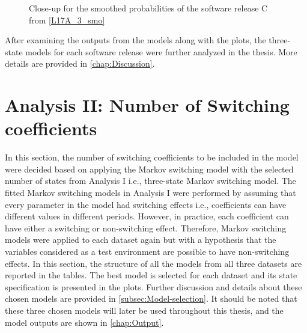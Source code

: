 \begin{figure}[H]

\caption{Close-up for the smoothed probabilities of the software release C
from \ref{L17A_3_smo}}

\end{figure}

After examining the outputs from the models along with the plots,
the three-state models for each software release were further analyzed
in the thesis. More details are provided in \ref{chap:Discussion}. 

\section{Analysis II: Number of Switching coefficients \label{sec:Switching}}

In this section, the number of switching coefficients to be included
in the model were decided based on applying the Markov switching model
with the selected number of states from Analysis I i.e., three-state
Markov switching model. The fitted Markov switching models in Analysis
I were performed by assuming that every parameter in the model had
switching effects i.e., coefficients can have different values in
different periods. However, in practice, each coefficient can have
either a switching or non-switching effect. Therefore, Markov switching
models were applied to each dataset again but with a hypothesis that
the variables considered as a test environment are possible to have
non-switching effects. In this section, the structure of all the models
from all three datasets are reported in the tables. The best model
is selected for each dataset and its state specification is presented
in the plots. Further discussion and details about these chosen models
are provided in \ref{subsec:Model-selection}. It should be noted
that these three chosen models will later be used throughout this
thesis, and the model outputs are shown in \ref{chap:Output}. 

